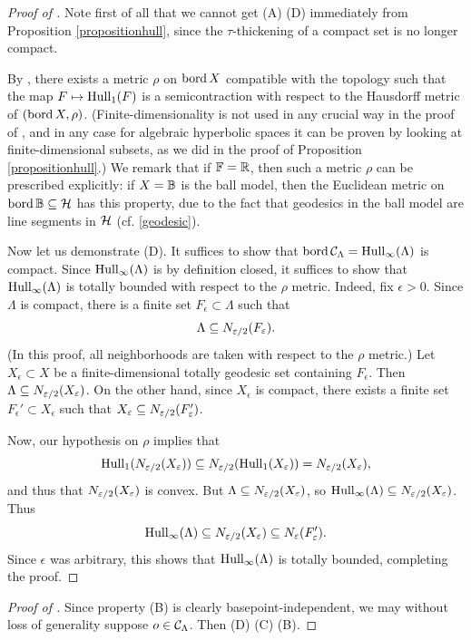 \begin{proof}[Proof of  \implies {}]
Note first of all that we cannot get (A) \implies (D) immediately from Proposition \ref{propositionhull}, since the $\tau$-thickening of a compact set is no longer compact.

By \cite[Proposition 1.5]{Bowditch_convexity}, there exists a metric $\rho$ on $\operatorname{bord} X$ compatible with the topology such that the map $F\mapsto \operatorname{Hull}_1(F)$ is a semicontraction with respect to the Hausdorff metric of $(\operatorname{bord} X,\rho)$. (Finite-dimensionality is not used in any crucial way in the proof of \cite[Proposition 1.5]{Bowditch_convexity}, and in any case for algebraic hyperbolic spaces it can be proven by looking at finite-dimensional subsets, as we did in the proof of Proposition \ref{propositionhull}.) We remark that if $\F = \R$, then such a metric $\rho$ can be prescribed explicitly: if $X = \B$ is the ball model, then the Euclidean metric on $\bord\B\subset\HH$ has this property, due to the fact that geodesics in the ball model are line segments in $\mathcal H$ (cf. \eqref{geodesic}).

Now let us demonstrate (D). It suffices to show that $\operatorname{bord}\mathcal C_\Lambda = \operatorname{Hull}_\infty(\Lambda)$ is compact. Since $\operatorname{Hull}_\infty(\Lambda)$ is by definition closed, it suffices to show that $\operatorname{Hull}_\infty(\Lambda)$ is totally bounded with respect to the $\rho$ metric. Indeed, fix $\epsilon > 0$. Since $\Lambda$ is compact, there is a finite set $F_\epsilon\subset\Lambda$ such that
\[
\Lambda\subseteq N_{\varepsilon/2}(F_\varepsilon).
\]
(In this proof, all neighborhoods are taken with respect to the $\rho$ metric.) Let $X_\epsilon \subset X$ be a finite-dimensional totally geodesic set containing $F_\epsilon$. Then $\Lambda\subseteq N_{\varepsilon/2}(X_\varepsilon)$. On the other hand, since $X_\epsilon$ is compact, there exists a finite set $F_\epsilon'\subset X_\epsilon$ such that $X_\varepsilon\subseteq N_{\varepsilon/2}(F_\varepsilon')$.

Now, our hypothesis on $\rho$ implies that
\[
\operatorname{Hull}_1(N_{\varepsilon/2}(X_\varepsilon)) \subseteq N_{\varepsilon/2}(\operatorname{Hull}_1(X_\varepsilon)) = N_{\varepsilon/2}(X_\varepsilon),
\]
and thus that $N_{\varepsilon/2}(X_\varepsilon)$ is convex. But $\Lambda\subseteq N_{\varepsilon/2}(X_\varepsilon)$, so $\operatorname{Hull}_\infty(\Lambda) \subseteq N_{\varepsilon/2}(X_\varepsilon)$. Thus
\[
\operatorname{Hull}_\infty(\Lambda)\subseteq N_{\varepsilon/2}(X_\varepsilon) \subseteq N_\varepsilon(F_\varepsilon').
\]
Since $\epsilon$ was arbitrary, this shows that $\operatorname{Hull}_\infty(\Lambda)$ is totally bounded, completing the proof.
\end{proof}
\begin{proof}[Proof of  \implies {}]
Since property (B) is clearly basepoint-independent, we may without loss of generality suppose $o\in\mathcal C_\Lambda$. Then (D) \implies (C) \implies (B).
\end{proof}

